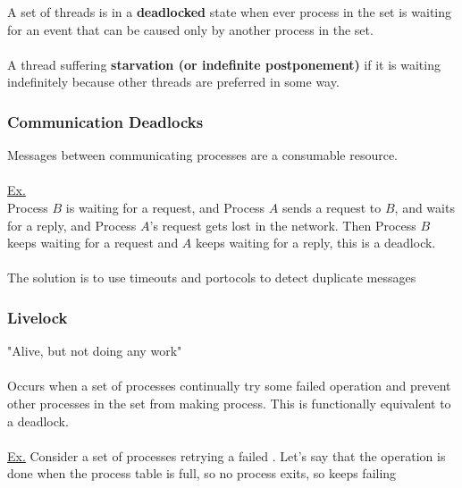 \documentclass{article}
\begin{document}
A set of threads is in a \textbf{deadlocked} state when ever process in the set is waiting for an event that can be caused only by another process in the set.
\\
\\
A thread suffering \textbf{starvation (or indefinite postponement)} if it is waiting indefinitely because other threads are preferred in some way.

\subsubsection{Communication Deadlocks}

Messages between communicating processes are a consumable resource.
\\
\\
\underline{Ex.}\\
Process $B$ is waiting for a request, and Process $A$ sends a request to $B$, and waits for a reply, and Process $A$'s request gets lost in the network. Then Process $B$ keeps waiting for a request and $A$ keeps waiting for a reply, this is a deadlock.
\\
\\
The solution is to use timeouts and portocols to detect duplicate messages

\subsubsection{Livelock}

"Alive, but not doing any work"
\\
\\
Occurs when a set of processes continually try some failed operation and prevent other processes in the set from making process. This is functionally equivalent to a deadlock.
\\
\\
\underline{Ex.} Consider a set of processes retrying a failed . Let's say that the operation is done when the process table is full, so no process exits, so  keeps failing

\newpage
\end{document}
